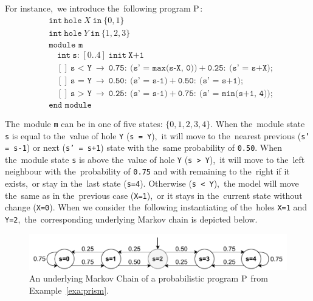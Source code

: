 \begin{example}
For instance,~we introduce the~following \prism{} program $\mathrm{P}$:
\begin{align*}
    & \texttt{int} \ \texttt{hole} \ \mathit{X} \ \texttt{in} \ \{ 0,1 \} \\
    & \texttt{int} \ \texttt{hole} \ \mathit{Y} \ \texttt{in} \ \{ 1,2,3 \} \\
    & \texttt{module m} \\
    & \quad \texttt{int} \ \texttt{s:} \; [0..4] \; \texttt{init} \ \texttt{X+1} \\
    & \quad [] \ \texttt{s < Y} \ \rightarrow \ \texttt{0.75}: \ \texttt{(s' = max(s-X, 0))} \ \texttt{+} \ \texttt{0.25}: \ \texttt{(s' = s+X)}; \\
    & \quad [] \ \texttt{s = Y} \ \rightarrow \ \texttt{0.50}: \ \texttt{(s' = s-1)} \ \texttt{+} \ \texttt{0.50}: \ \texttt{(s' = s+1)}; \\
    & \quad [] \ \texttt{s > Y} \ \rightarrow \ \texttt{0.25}: \ \texttt{(s' = s-1)} \ \texttt{+} \ \texttt{0.75}: \ \texttt{(s' = min(s+1, 4))};  \\
    & \texttt{end module}
\end{align*}
\label{exa:prism}
\end{example}
The~module \texttt{m} can be in one of five states: $\{ 0,1,2,3,4 \}$.
When the~module state \texttt{s} is equal to the~value of hole \texttt{Y} (\texttt{s = Y}),~it will move to the~nearest previous (\texttt{s' = s-1}) or next (\texttt{s' = s+1}) state with the~same probability of \texttt{0.50}.
When the~module state \texttt{s} is above the~value of hole \texttt{Y} (\texttt{s > Y}),~it will move to the~left neighbour with the~probability of \texttt{0.75} and with remaining to the~right if it exists,~or stay in the~last state (\texttt{s=4}).
Otherwise (\texttt{s < Y}),~the model will move the~same as in the~previous case (\texttt{X=1}),~or it stays in the~current state without change (\texttt{X=0}).
When we consider the~following instantiating of the~holes \texttt{X=1} and \texttt{Y=2},~the~corresponding underlying Markov chain is depicted below.

\begin{figure}[h!]
\centering
\includegraphics[width=1.0\textwidth]{figures/prism_dtmc.pdf}
\caption{An underlying Markov Chain of a probabilistic program $\mathrm{P}$ from Example~\ref{exa:prism}.}%
\label{fig:architecture}%
\end{figure}

